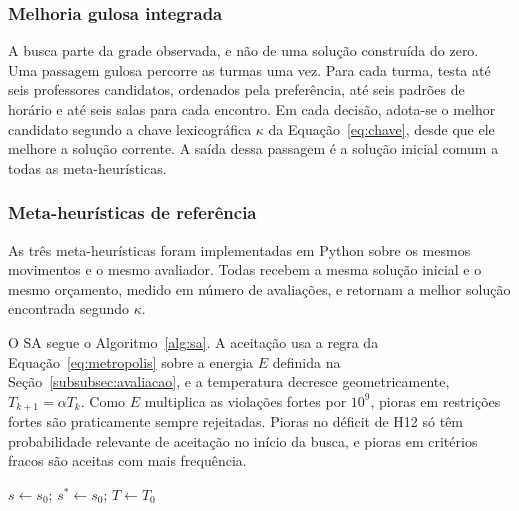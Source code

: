 \subsubsection{Melhoria gulosa integrada}

A busca parte da grade observada, e não de uma solução construída do zero. Uma passagem gulosa percorre as turmas uma vez. Para cada turma, testa até seis professores candidatos, ordenados pela preferência, até seis padrões de horário e até seis salas para cada encontro. Em cada decisão, adota-se o melhor candidato segundo a chave lexicográfica $\kappa$ da Equação~\eqref{eq:chave}, desde que ele melhore a solução corrente. A saída dessa passagem é a solução inicial comum a todas as meta-heurísticas.

\subsubsection{Meta-heurísticas de referência}

As três meta-heurísticas foram implementadas em Python sobre os mesmos movimentos e o mesmo avaliador. Todas recebem a mesma solução inicial e o mesmo orçamento, medido em número de avaliações, e retornam a melhor solução encontrada segundo $\kappa$.

O SA segue o Algoritmo~\ref{alg:sa}. A aceitação usa a regra da Equação~\eqref{eq:metropolis} sobre a energia $E$ definida na Seção~\ref{subsubsec:avaliacao}, e a temperatura decresce geometricamente, $T_{k+1}=\alpha T_k$. Como $E$ multiplica as violações fortes por $10^9$, pioras em restrições fortes são praticamente sempre rejeitadas. Pioras no déficit de H12 só têm probabilidade relevante de aceitação no início da busca, e pioras em critérios fracos são aceitas com mais frequência.

\begin{algorithm}[htbp]
  \DontPrintSemicolon
  $s\gets s_0$; \quad $s^*\gets s_0$; \quad $T\gets T_0$\;
  \;
  \caption{\textit{Simulated Annealing} de referência sobre as vizinhanças integradas}
  \label{alg:sa}
\end{algorithm}

